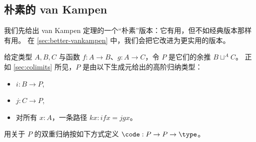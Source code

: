 \subsection{朴素的 van Kampen}
\label{sec:naive-vankampen}

我们先给出 van Kampen 定理的一个“朴素”版本：它有用，但不如经典版本那样有用。
在 \cref{sec:better-vankampen} 中，我们会把它改进为更实用的版本。

%

给定类型 $A,B,C$ 与函数 $f:A\to B$、$g:A\to C$，令 $P$ 是它们的余推 $B\sqcup^A C$。
正如 \cref{sec:colimits} 所见，$P$ 是由以下生成元给出的高阶归纳类型：
\begin{itemize}
\item $i:B\to P$,
\item $j:C\to P$,
\item 对所有 $x:A$，一条路径 $k x:ifx = jgx$。
\end{itemize}
用关于 $P$ 的双重归纳按如下方式定义 $\code:P\to P\to \type$。
